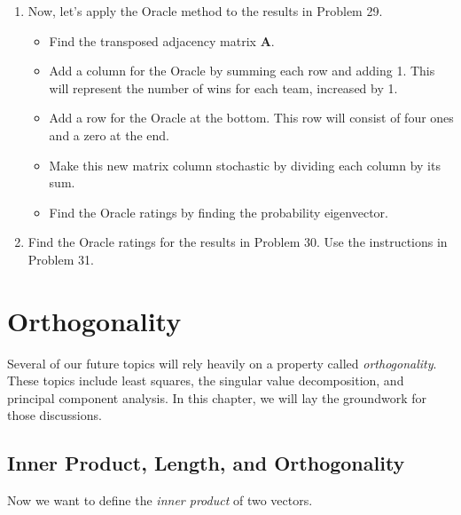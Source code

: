\documentclass[
]{book}
\providecommand{\tightlist}{%
  \setlength{\itemsep}{0pt}\setlength{\parskip}{0pt}}
\theoremstyle{definition}
\theoremstyle{definition}
\theoremstyle{definition}
\theoremstyle{definition}
\theoremstyle{remark}
\begin{document}
\begin{enumerate}
\def\labelenumi{\arabic{enumi}.}
\setcounter{enumi}{30}
\tightlist
\item
  Now, let's apply the Oracle method to the results in Problem 29.

  \begin{itemize}
  \tightlist
  \item
    Find the transposed adjacency matrix \(\mathbf{A}.\)
  \item
    Add a column for the Oracle by summing each row and adding 1. This will represent the number of wins for each team, increased by 1.
  \item
    Add a row for the Oracle at the bottom. This row will consist of four ones and a zero at the end.
  \item
    Make this new matrix column stochastic by dividing each column by its sum.
  \item
    Find the Oracle ratings by finding the probability eigenvector.
  \end{itemize}
\item
  Find the Oracle ratings for the results in Problem 30. Use the instructions in Problem 31.
\end{enumerate}

\chapter{Orthogonality}\label{orthogonality}

Several of our future topics will rely heavily on a property called \emph{orthogonality}. These topics include least squares, the singular value decomposition, and principal component analysis. In this chapter, we will lay the groundwork for those discussions.

\section{Inner Product, Length, and Orthogonality}\label{ILO}

Now we want to define the \emph{inner product} of two vectors.
\end{document}
